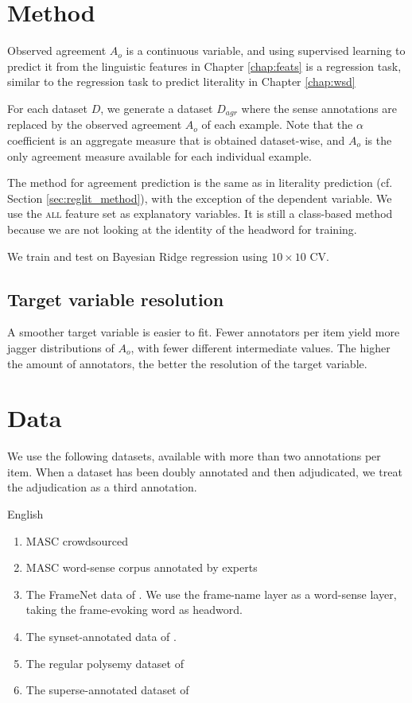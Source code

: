 \documentclass[11pt,a4paper]{article}
\begin{document}
\section{Method}

Observed agreement $A_o$ is a continuous variable, and using supervised learning to predict it from the linguistic features in Chapter \ref{chap:feats} is a regression task, similar to the regression task to predict literality in Chapter \ref{chap:wsd}

For each dataset $D$, we generate a dataset $D_{agr}$ where the sense annotations are replaced by the observed agreement $A_o$ of each example. Note that the $\alpha$ coefficient is an aggregate measure that is obtained dataset-wise, and $A_o$ is the only agreement measure available for each individual example.

The method for agreement prediction is the same as in literality prediction (cf. Section \ref{sec:reglit_method}), with the exception of the dependent variable. We use the \textsc{all} feature set as explanatory variables. It is still a class-based method because we are not looking at the identity of the headword for training. 

We train and test on Bayesian Ridge regression using  $10\times10$ CV.

\subsection{Target variable resolution}
A smoother target variable is easier to fit. Fewer annotators per item yield more jagger distributions of $A_o$, with fewer different intermediate values. The higher the amount of annotators, the better the resolution of the target variable. 

\section{Data}
We use the following datasets, available with more than two annotations per item. When a dataset has been doubly annotated and then adjudicated, we treat the adjudication as a third annotation.


English\\
\begin{enumerate}[noitemsep]
\item MASC \cite{Passonneau2012} crowdsourced 
\item MASC word-sense corpus annotated by experts \cite{Passenau2010}
\item The FrameNet data of \cite{Sogaard2015}. We use the frame-name layer as a word-sense layer, taking the frame-evoking word as headword.
\item The synset-annotated data of \cite{Gella2014}.
\item The regular polysemy dataset of \cite{MartinezAlonso2013}
\item The superse-annotated dataset of \cite{Johannsen2014}
\end{enumerate}
\end{document}
